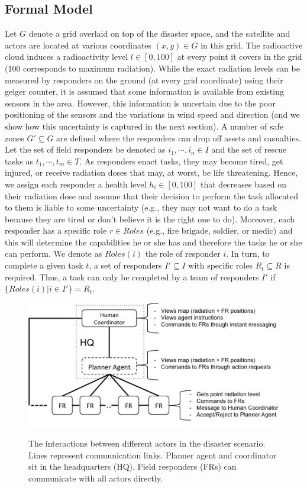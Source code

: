 \subsection{Formal Model}
\noindent Let $G$ denote a grid overlaid on top of the disaster space, and the satellite and actors are located at various coordinates $(x,y) \in G$ in this grid. The radioactive cloud induces a radioactivity level  $l \in [0,100]$ at every point it covers in the grid (100 corresponds to maximum radiation). While the exact radiation levels can be measured by responders on the ground (at every grid coordinate) using their geiger counter, it is assumed that some information is available  from existing sensors  in the area. However, this information is uncertain due to the poor positioning of the sensors and the variations in wind speed and direction (and we show how this uncertainty is captured in the next section). A number of safe zones $G' \subseteq G$ are defined where the responders can drop off assets and casualties. Let the set of field responders be denoted as $i_1, \cdots, i_n \in I$ and the set of rescue tasks as  $t_1,\cdots, t_m\in T$.  As responders enact tasks, they may become tired, get injured, or receive radiation doses that may, at worst, be life threatening. Hence, we assign each responder  a health level $h_i\in [0,100]$ that decreases based on their radiation dose and assume that their decision to perform the task allocated to them is liable to some uncertainty (e.g., they may not want to do a task because they are tired or don't believe it is the right one to do). Moreover, each responder has  a specific role  $r \in Roles$ (e.g., fire brigade, soldier, or medic) and this will determine the capabilities he or she has and therefore the tasks he or she can perform. We denote as $Roles(i)$ the role of responder $i$. In turn, to complete a given task $t$,  a set of responders $I' \subseteq I$ with specific roles $R_t \subseteq R$ is required. Thus, a task can only be completed by a team of responders $I'$ if $\{Roles(i) | i \in I'\} = R_t$. 
\begin{figure}[htbp]
\includegraphics[width=\columnwidth]{scenario.jpg}
\label{fig:scenario}
\caption{The interactions between different actors in the disaster scenario. Lines represent communication links. Planner agent and coordinator sit in the headquarters (HQ). Field responders (FRs) can communicate with all actors directly.}
\end{figure}
